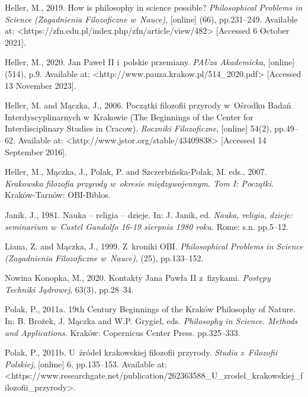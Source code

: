 Heller, M., 2019. How is philosophy in science possible? \textit{Philosophical Problems in Science (Zagadnienia Filozoficzne w~Nauce)}, [online] (66), pp.231–249. Available at: {\textless}https://zfn.edu.pl/index.php/zfn/article/view/482{\textgreater} [Accessed 6 October 2021].



Heller, M., 2020. Jan Paweł II i~polskie przemiany. \textit{PAUza Akademicka}, [online] (514), p.9. Available at: {\textless}http://www.pauza.krakow.pl/514\_2020.pdf{\textgreater} [Accessed 13 November 2023].



Heller, M. and Mączka, J., 2006. Początki filozofii przyrody w~Ośrodku Badań Interdyscyplinarnych w~Krakowie (The Beginnings of the Center for Interdisciplinary Studies in Cracow). \textit{Roczniki Filozoficzne}, [online] 54(2), pp.49–62. Available at: {\textless}http://www.jstor.org/stable/43409838{\textgreater} [Accessed 14 September 2016].



Heller, M., Mączka, J., Polak, P. and Szczerbińska-Polak, M. eds., 2007. \textit{Krakowska filozofia przyrody w~okresie międzywojennym. Tom I: Początki}. Kraków-Tarnów: OBI-Biblos.



Janik, J., 1981. Nauka -- religia -- dzieje. In: J. Janik, ed. \textit{Nauka, religia, dzieje: seminarium w~Castel Gandolfo 16-19 sierpnia 1980 roku.} Rome: s.n. pp.5–12.



Liana, Z. and Mączka, J., 1999. Z~kroniki OBI. \textit{Philosophical Problems in Science (Zagadnienia Filozoficzne w~Nauce)}, (25), pp.133–152.



Nowina Konopka, M., 2020. Kontakty Jana Pawła II z~fizykami. \textit{Postępy Techniki Jądrowej}, 63(3), pp.28–34.



Polak, P., 2011a. 19th Century Beginnings of the Kraków Philosophy of Nature. In: B. Brożek, J. Mączka and W.P. Grygiel, eds. \textit{Philosophy in Science. Methods and Applications}. Kraków: Copernicus Center Press. pp.325–333.



Polak, P., 2011b. U~źródeł krakowskiej filozofii przyrody. \textit{Studia z~Filozofii Polskiej}, [online] 6, pp.135–153. Available at: {\textless}https://www.researchgate.net/publication/262363588\_U\_zrodel\_krakowskiej\_filozofii\_przyrody{\textgreater}.



